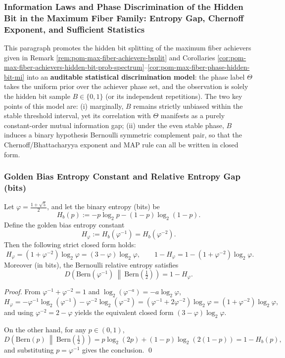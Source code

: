 \subsubsection{Information Laws and Phase Discrimination of the Hidden Bit in the Maximum Fiber Family: Entropy Gap, Chernoff Exponent, and Sufficient Statistics}\label{subsubsec:pom-max-fiber-hidden-bit-phase-inference}

This paragraph promotes the hidden bit splitting of the maximum fiber achievers given in Remark \ref{rem:pom-max-fiber-achievers-bsplit} and Corollaries
\ref{cor:pom-max-fiber-achievers-hidden-bit-prob-spectrum}--\ref{cor:pom-max-fiber-phase-hidden-bit-mi}
into an \textbf{auditable statistical discrimination model}:
the phase label \(\Theta\) takes the uniform prior over the achiever phase set, and the observation is solely the hidden bit sample \(B\in\{0,1\}\) (or its independent repetitions).
The two key points of this model are:
(i) marginally, \(B\) remains strictly unbiased within the stable threshold interval, yet its correlation with \(\Theta\) manifests as a purely constant-order mutual information gap;
(ii) under the even stable phase, \(B\) induces a binary hypothesis Bernoulli symmetric complement pair, so that the Chernoff/Bhattacharyya exponent and MAP rule can all be written in closed form.

\subsubsection{Golden Bias Entropy Constant and Relative Entropy Gap (bits)}

\begin{proposition}\label{prop:pom-max-fiber-hphi-relative-entropy-gap}
Let \(\varphi=\frac{1+\sqrt5}{2}\), and let the binary entropy (bits) be
\[
H_b(p):=-p\log_2 p-(1-p)\log_2(1-p).
\]
Define the golden bias entropy constant
\[
H_\varphi:=H_b(\varphi^{-1})=H_b(\varphi^{-2}).
\]
Then the following strict closed form holds:
\[
\boxed{\;
H_\varphi=(1+\varphi^{-2})\log_2\varphi=(3-\varphi)\log_2\varphi,\qquad
1-H_\varphi=1-(1+\varphi^{-2})\log_2\varphi.\;}
\]
Moreover (in bits), the Bernoulli relative entropy satisfies
\[
\boxed{\;
D\!\left(\mathrm{Bern}(\varphi^{-1})\ \middle\|\ \mathrm{Bern}\!\left(\tfrac12\right)\right)=1-H_\varphi.\;}
\]
\end{proposition}

\begin{proof}
From \(\varphi^{-1}+\varphi^{-2}=1\) and \(\log_2(\varphi^{-a})=-a\log_2\varphi\),
\[
H_\varphi
=-\varphi^{-1}\log_2(\varphi^{-1})-\varphi^{-2}\log_2(\varphi^{-2})
=(\varphi^{-1}+2\varphi^{-2})\log_2\varphi
=(1+\varphi^{-2})\log_2\varphi,
\]
and using \(\varphi^{-2}=2-\varphi\) yields the equivalent closed form \((3-\varphi)\log_2\varphi\).
\par
On the other hand, for any \(p\in(0,1)\),
\[
D\!\left(\mathrm{Bern}(p)\ \middle\|\ \mathrm{Bern}\!\left(\tfrac12\right)\right)
=p\log_2(2p)+(1-p)\log_2(2(1-p))
=1-H_b(p),
\]
and substituting \(p=\varphi^{-1}\) gives the conclusion. \qed
\end{proof}

